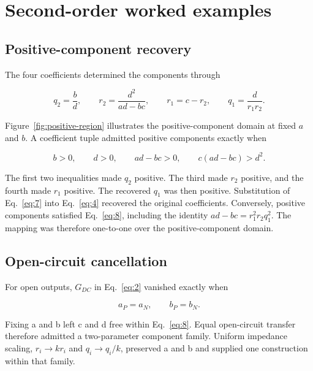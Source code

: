 \section{Second-order worked examples}

\subsection{Positive-component recovery}

The four coefficients determined the components through

\begin{equation}\label{eq:7}
q_2=\frac{b}{d},\qquad
r_2=\frac{d^2}{ad-bc},\qquad
r_1=c-r_2,\qquad
q_1=\frac{d}{r_1r_2}.
\end{equation}

Figure~\ref{fig:positive-region} illustrates the positive-component domain at fixed $a$ and $b$. A coefficient tuple admitted positive components exactly when

\begin{equation}\label{eq:8}
b>0,\qquad d>0,\qquad ad-bc>0,\qquad
c(ad-bc)>d^2.
\end{equation}

The first two inequalities made \(q_2\) positive. The third made \(r_2\) positive, and the fourth made \(r_1\) positive. The recovered \(q_1\) was then positive. Substitution of Eq.~\eqref{eq:7} into Eq.~\eqref{eq:4} recovered the original coefficients. Conversely, positive components satisfied Eq.~\eqref{eq:8}, including the identity \(ad-bc=r_1^2r_2q_1^2\). The mapping was therefore one-to-one over the positive-component domain.



\subsection{Open-circuit cancellation}

For open outputs, \(G_{DC}\) in Eq.~\eqref{eq:2} vanished exactly when

\begin{equation}\label{eq:9}
a_P=a_N,\qquad b_P=b_N.
\end{equation}

Fixing a and b left c and d free within Eq.~\eqref{eq:8}. Equal open-circuit transfer therefore admitted a two-parameter component family. Uniform impedance scaling, \(r_i\rightarrow kr_i\) and \(q_i\rightarrow q_i/k\), preserved a and b and supplied one construction within that family.

